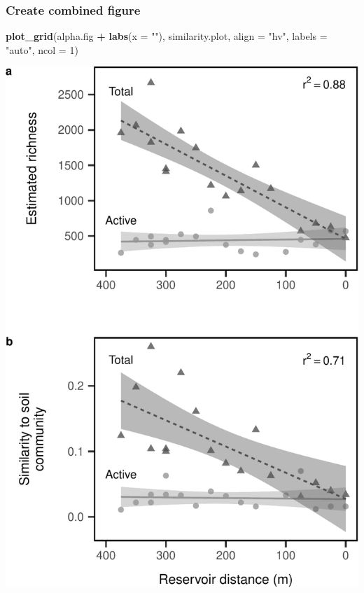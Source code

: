 \documentclass[]{article}
\newenvironment{Shaded}{\begin{snugshade}}{\end{snugshade}}
\newcommand{\KeywordTok}[1]{\textcolor[rgb]{0.13,0.29,0.53}{\textbf{#1}}}
\newcommand{\DataTypeTok}[1]{\textcolor[rgb]{0.13,0.29,0.53}{#1}}
\newcommand{\DecValTok}[1]{\textcolor[rgb]{0.00,0.00,0.81}{#1}}
\newcommand{\StringTok}[1]{\textcolor[rgb]{0.31,0.60,0.02}{#1}}
\newcommand{\OperatorTok}[1]{\textcolor[rgb]{0.81,0.36,0.00}{\textbf{#1}}}
\newcommand{\NormalTok}[1]{#1}
\begin{document}
\subsubsection{Create combined figure}\label{create-combined-figure}

\begin{Shaded}
\begin{Highlighting}[]
\KeywordTok{plot_grid}\NormalTok{(alpha.fig }\OperatorTok{+}\StringTok{ }\KeywordTok{labs}\NormalTok{(}\DataTypeTok{x =} \StringTok{""}\NormalTok{), similarity.plot, }
          \DataTypeTok{align =} \StringTok{"hv"}\NormalTok{,}
          \DataTypeTok{labels =} \StringTok{"auto"}\NormalTok{, }\DataTypeTok{ncol =} \DecValTok{1}\NormalTok{)}
\end{Highlighting}
\end{Shaded}

\begin{center}\includegraphics{ReservoirGradient_files/figure-latex/combined-plots-1} \end{center}
\end{document}
